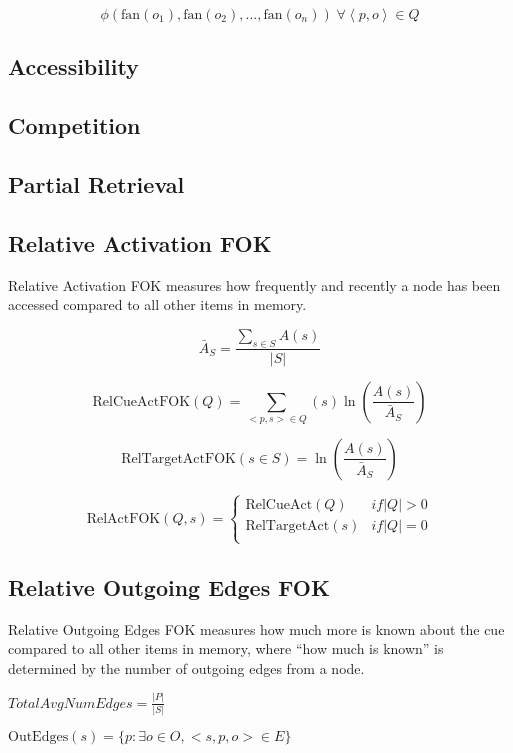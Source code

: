 \documentclass[10pt,letterpaper]{article}
\newcommand{\tuple}[1]{\left \langle #1 \right \rangle }
\begin{document}
$$\phi\left(\text{fan}(o_1), \text{fan}(o_2), ..., \text{fan}(o_n)\right) \; \forall {\tuple{p, o}{\in}Q}$$

\subsection{Accessibility}

\subsection{Competition}

\subsection{Partial Retrieval}

\subsection{Relative Activation FOK}

Relative Activation FOK measures how frequently and recently a node has been accessed compared to all other items in memory.

$$\bar{A}_S = \frac {\sum_{s{\in}S} {A(s)}}{|S|}$$

$$\text{RelCueActFOK}(Q) = \sum_{<p, s> \in Q} (s) \ln(\frac{A(s)}{\bar{A}_S})$$

$$\text{RelTargetActFOK}(s{\in}S) = \ln(\frac{A(s)}{\bar{A}_S})$$

$$\text{RelActFOK}(Q, s) =
\begin{cases}
    \text{RelCueAct}(Q) & {if |Q| > 0} \\
    \text{RelTargetAct}(s)& {if |Q| = 0} \\
\end{cases}
$$

\subsection{Relative Outgoing Edges FOK}

Relative Outgoing Edges FOK measures how much more is known about the cue compared to all other items in memory, where “how much is known” is determined by the number of outgoing edges from a node.

$TotalAvgNumEdges = \frac{|P|}{|S|}$

$\text{OutEdges}(s) = \{p : \exists o{\in}O, <s, p, o>{\in}E \}$
\end{document}
